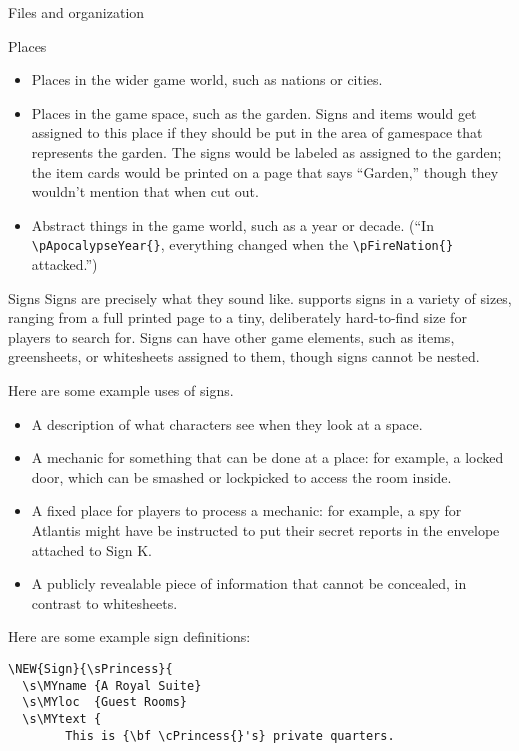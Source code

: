 \documentclass[sheet]{GameTexBase}
\begin{document}
\begin{section}{Files and organization}
\begin{subsection}{Places}
\begin{itemize}
\item Places in the wider game world, such as nations or cities.
\item Places in the game space, such as the garden.  Signs and items would get assigned to this place if they should be put in the area of gamespace that represents the garden.  The signs would be labeled as assigned to the garden; 
the item cards would be printed on a page that says ``Garden,'' though they wouldn't mention that when cut out.
\item Abstract things in the game world, such as a year or decade.  (``In \lstinline|\pApocalypseYear{}|, everything changed when the \lstinline|\pFireNation{}| attacked.'')
\end{itemize}
\end{subsection}
\begin{subsection}{Signs}
Signs are precisely what they sound like.  \gametex{} supports signs in a variety of sizes, ranging from a full printed page to a tiny, deliberately hard-to-find size for players to search for.
Signs can have other game elements, such as items, greensheets, or whitesheets assigned to them, though signs cannot be nested.

Here are some example uses of signs.
\begin{itemize}
\item A description of what characters see when they look at a space.
\item A mechanic for something that can be done at a place: for example, a locked door, which can be smashed or lockpicked to access the room inside.
\item A fixed place for players to process a mechanic: for example, a spy for Atlantis might have be instructed to put their secret reports in the envelope attached to Sign K.
\item A publicly revealable piece of information that cannot be concealed, in contrast to whitesheets.
\end{itemize}

Here are some example sign definitions:
\begin{verbatim}
\NEW{Sign}{\sPrincess}{
  \s\MYname	{A Royal Suite}
  \s\MYloc	{Guest Rooms}
  \s\MYtext	{
		This is {\bf \cPrincess{}'s} private quarters.
		

\end{verbatim}
\end{subsection}
\end{section}
\end{document}
